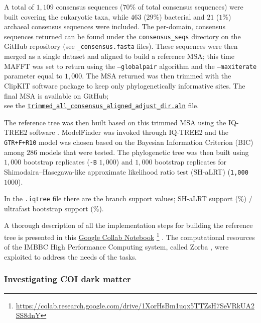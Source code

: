    A total of $1,109$ consensus sequences ($70\%$ of total consensus sequences) were built covering the eukaryotic taxa, 
   while $463$ ($29\%$) bacterial and $21$ ($1\%$) archaeal consensus sequences were included. 
   The per-domain, consensus sequences returned can be found under the \texttt{consensus\_seqs} directory on 
   the GitHub repository 
   (see \texttt{\_consensus.fasta} files). 
   These sequences were then merged as a single dataset and aligned to build a reference MSA; 
   this time MAFFT was set to return using the \texttt{--globalpair} algorithm and the \texttt{--maxiterate} parameter 
   equal to $1,000$. 
   The MSA returned was then trimmed with the ClipKIT software package \citep{steenwyk_clipkit_2020} to keep only phylogenetically informative sites. 
   The final MSA is available on GitHub; \\
   see the \href{https://github.com/hariszaf/coi_dark_matter/blob/6df8559f27165f5327e4e56e9c36f5fab291fe49/build_tree_of_life/consensus_seqs/trimmed_all_consensus_aligned_adjust_dir.aln}{\texttt{trimmed\_all\_consensus\_aligned\_adjust\_dir.aln}} file.

   The reference tree was then built based on this trimmed MSA using the IQ-TREE2 software \citep{hoang2018ufboot2, minh_iq-tree_2020}.
   ModelFinder was invoked through IQ-TREE2 and the \texttt{GTR+F+R10} model was chosen based on the 
   Bayesian Information Criterion (BIC) among $286$ models that were tested. 
   The phylogenetic tree was then built using $1,000$ bootstrap replicates (\texttt{-B} $1,000$) and 
   $1,000$ bootstrap replicates for Shimodaira–Hasegawa-like approximate likelihood ratio test (SH-aLRT) (\texttt{1,000} $1000$).
   
   In the \texttt{.iqtree} file there are the branch support values; SH-aLRT support (\%) / ultrafast bootstrap support (\%).
   
   A thorough description of all the implementation steps for building the reference tree is presented in this 
   \href{https://colab.research.google.com/drive/1XorHsBm1uqx5TTZsH7SeVRkUA2SS8dnY}{Google Collab Notebook} 
   \footnote{
      \href{https://colab.research.google.com/drive/1XorHsBm1uqx5TTZsH7SeVRkUA2SS8dnY}{https://colab.research.google.com/drive/1XorHsBm1uqx5TTZsH7SeVRkUA2SS8dnY}
   }
   . 
   The computational resources of the IMBBC High Performance Computing system, called Zorba \citep{zafeiropoulos_0s_2021}, were exploited to address the needs of the tasks.


   \subsubsection*{Investigating COI dark matter}
   \label{subsec:darn-methods-investigate}

